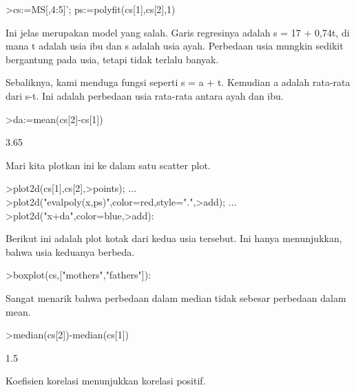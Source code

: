 \documentclass[12pt,Times new roman,letterpaper]{book}
\begin{document}
\begin{eulernootebook}
\begin{eulercomment}
\begin{eulercomment}
\begin{eulernootebook}
\begin{eulercomment}
\begin{eulercomment}
\begin{eulercomment}
\begin{eulercomment}
\begin{eulercomment}
\begin{eulercomment}
\begin{eulercomment}
\begin{eulerprompt}
>cs:=MS[,4:5]'; ps:=polyfit(cs[1],cs[2],1)
\end{eulerprompt}
\begin{euleroutput}
  [17.3789,  0.740964]
\end{euleroutput}
\begin{eulercomment}
Ini jelas merupakan model yang salah. Garis regresinya adalah s = 17 +
0,74t, di mana t adalah usia ibu dan s adalah usia ayah. Perbedaan
usia mungkin sedikit bergantung pada usia, tetapi tidak terlalu
banyak.

Sebaliknya, kami menduga fungsi seperti s = a + t. Kemudian a adalah
rata-rata dari s-t. Ini adalah perbedaan usia rata-rata antara ayah
dan ibu.
\end{eulercomment}
\begin{eulerprompt}
>da:=mean(cs[2]-cs[1])
\end{eulerprompt}
\begin{euleroutput}
  3.65
\end{euleroutput}
\begin{eulercomment}
Mari kita plotkan ini ke dalam satu scatter plot.
\end{eulercomment}
\begin{eulerprompt}
>plot2d(cs[1],cs[2],>points);  ...
>plot2d("evalpoly(x,ps)",color=red,style=".",>add);  ...
>plot2d("x+da",color=blue,>add):
\end{eulerprompt}
\begin{eulercomment}
Berikut ini adalah plot kotak dari kedua usia tersebut. Ini hanya
menunjukkan, bahwa usia keduanya berbeda.
\end{eulercomment}
\begin{eulerprompt}
>boxplot(cs,["mothers","fathers"]):
\end{eulerprompt}
\begin{eulercomment}
Sangat menarik bahwa perbedaan dalam median tidak sebesar perbedaan
dalam mean.
\end{eulercomment}
\begin{eulerprompt}
>median(cs[2])-median(cs[1])
\end{eulerprompt}
\begin{euleroutput}
  1.5
\end{euleroutput}
\begin{eulercomment}
Koefisien korelasi menunjukkan korelasi positif.
\end{eulercomment}

\end{eulercomment}
\end{eulercomment}
\end{eulercomment}
\end{eulercomment}
\end{eulercomment}
\end{eulercomment}
\end{eulercomment}
\end{eulernootebook}
\end{eulercomment}
\end{eulercomment}
\end{eulernootebook}
\end{document}
